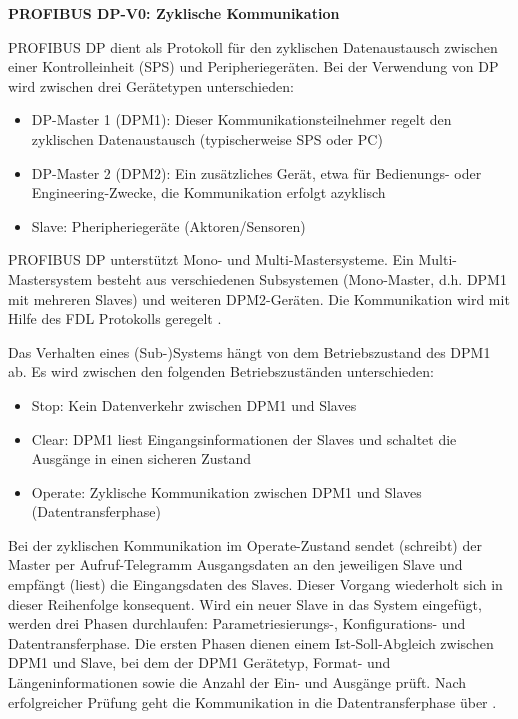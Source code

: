 \textbf{PROFIBUS DP-V0: Zyklische Kommunikation}

PROFIBUS DP dient als Protokoll für den zyklischen Datenaustausch zwischen einer Kontrolleinheit (SPS) und Peripheriegeräten. Bei der Verwendung von DP wird zwischen drei Gerätetypen unterschieden:
\begin{itemize}
\item DP-Master 1 (DPM1): Dieser Kommunikationsteilnehmer regelt den zyklischen Datenaustausch (typischerweise SPS oder PC)
\item DP-Master 2 (DPM2): Ein zusätzliches Gerät, etwa für Bedienungs- oder Engineering-Zwecke, die Kommunikation erfolgt azyklisch
\item Slave: Pheripheriegeräte (Aktoren/Sensoren)
\end{itemize}

PROFIBUS DP unterstützt Mono- und Multi-Mastersysteme. Ein Multi-Mastersystem besteht aus verschiedenen Subsystemen (Mono-Master, d.h. DPM1 mit mehreren Slaves) und weiteren DPM2-Geräten. Die Kommunikation wird mit Hilfe des FDL Protokolls geregelt \citep{Profibus5}.


Das Verhalten eines (Sub-)Systems hängt von dem Betriebszustand des DPM1 ab. Es wird zwischen den folgenden Betriebszuständen unterschieden:
\begin{itemize}
\item Stop: Kein Datenverkehr zwischen DPM1 und Slaves
\item Clear: DPM1 liest Eingangsinformationen der Slaves und schaltet die Ausgänge in einen sicheren Zustand
\item Operate: Zyklische Kommunikation zwischen DPM1 und Slaves (Datentransferphase)
\end{itemize}

Bei der zyklischen Kommunikation im \glqq Operate\grqq -Zustand sendet (schreibt) der Master per Aufruf-Telegramm Ausgangsdaten an den jeweiligen Slave und empfängt (liest) die Eingangsdaten des Slaves. Dieser Vorgang wiederholt sich in dieser Reihenfolge konsequent. Wird ein neuer Slave in das System eingefügt, werden drei Phasen durchlaufen: Parametriesierungs-, Konfigurations- und Datentransferphase. Die ersten Phasen dienen einem Ist-Soll-Abgleich zwischen DPM1 und Slave, bei dem der DPM1 Gerätetyp, Format- und Längeninformationen sowie die Anzahl der Ein- und Ausgänge prüft. Nach erfolgreicher Prüfung geht die Kommunikation in die Datentransferphase über \citep{Profibus5}. 


